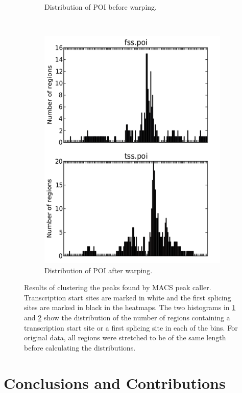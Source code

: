 \documentclass[parskip]{cs4rep}
\begin{document}
\begin{figure}
\begin{subfigure}[b]{0.3\textwidth}
        \caption{Distribution of POI before warping.}
        \label{fig:evaluation:macs-peaks:histogram-original}
    \end{subfigure}
    ~
    \begin{subfigure}[b]{0.3\textwidth}
         \centering
        \includegraphics[width=\textwidth]{figures/evaluation/macs-peaks/cluster-35-warped-histogram-clean.png}
        \caption{Distribution of POI after warping.}
        \label{fig:evaluation:macs-peaks:histogram-warped}
    \end{subfigure}
    \caption{Results of clustering the peaks found by MACS peak caller. Transcription start sites are marked in white and the first splicing sites are marked in black in the heatmaps. The two histograms in \ref{fig:evaluation:macs-peaks:histogram-original} and \ref{fig:evaluation:macs-peaks:histogram-warped} show the distribution of the number of regions containing a transcription start site or a first splicing site in each of the bins. For original data, all regions were stretched to be of the same length before calculating the distributions.}
    \label{fig:evaluation:macs-peaks}
\end{figure}

\chapter{Conclusions and Contributions}




\appendix
{}
\end{document}
